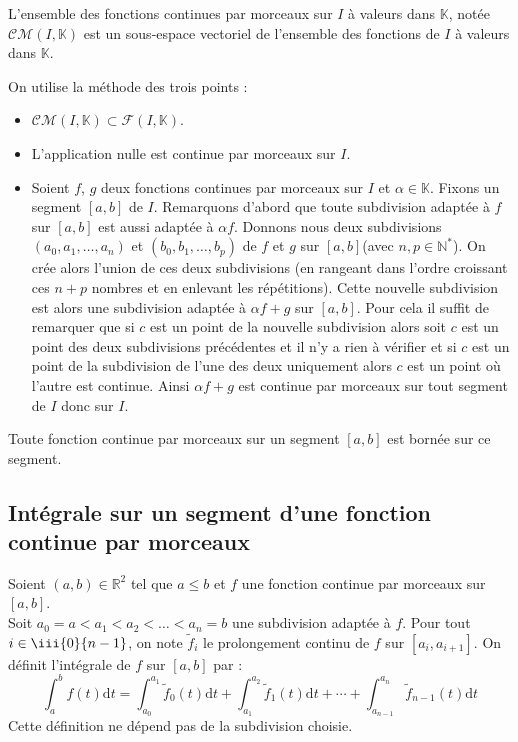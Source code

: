 \documentclass[french,11pt,twoside]{VcCours}
\newcommand{\dt}{\text{d}t}
\begin{document}
\begin{Proposition}{} L'ensemble des fonctions continues par morceaux sur $I$ à valeurs dans $\mathbb{K}$, notée $\mathcal{CM}(I,\mathbb{K})$ est un sous-espace vectoriel de l'ensemble des fonctions de $I$ à valeurs dans $\mathbb{K}$.
\end{Proposition}

\begin{Demonstration}{} On utilise la méthode des trois points :

\begin{itemize}
\item $\mathcal{CM}(I,\mathbb{K}) \subset \mathcal{F}(I, \mathbb{K})$.
\item L'application nulle est continue par morceaux sur $I$.
\item Soient $f$, $g$ deux fonctions continues par morceaux sur $I$ et $\alpha \in \mathbb{K}$. Fixons un segment $[a,b]$ de $I$. Remarquons d'abord que toute subdivision adaptée à $f$ sur $[a,b]$ est aussi adaptée à $\alpha f$. Donnons nous deux subdivisions $(a_0, a_1, \ldots, a_n)$ et $(b_0,b_1, \ldots, b_p)$ de $f$ et $g$ sur $[a,b]$(avec $n,p \in \mathbb{N}^*$). On crée alors l'union de ces deux subdivisions (en rangeant dans l'ordre croissant ces $n+p$ nombres et en enlevant les répétitions). Cette nouvelle subdivision est alors une subdivision adaptée à $\alpha f + g$ sur $[a,b]$. Pour cela il suffit de remarquer que si $c$ est un point de la nouvelle subdivision alors soit $c$ est un point des deux subdivisions précédentes et il n'y a rien à vérifier et si $c$ est un point de la subdivision de l'une des deux uniquement alors $c$ est un point où l'autre est continue. Ainsi $\alpha f+g$ est continue par morceaux sur tout segment de $I$ donc sur $I$.
\end{itemize}\vspace{-2em}
\end{Demonstration}

\begin{Proposition}{} Toute fonction continue par morceaux sur un segment $[a,b]$ est bornée sur ce segment.
\end{Proposition}



\subsection{Intégrale sur un segment d'une fonction continue par morceaux}

\begin{TheoremeDefinition}{} 
Soient $(a,b) \in \mathbb{R}^2$ tel que $a \leq b$ et $f$ une fonction continue par morceaux sur $[a,b]$.\\
Soit $a_0 = a < a_1 < a_2 < \dots < a_n =b$ une subdivision adaptée à $f$. Pour tout $i \in \iii{0}{n-1}$, on note $\tilde{f}_i$ le prolongement continu de $f$ sur $[a_i,a_{i+1}]$. On définit l'intégrale de $f$ sur $[a,b]$ par :
$$ \int_{a}^b f(t) \dt = \int_{a_0}^{a_1} \tilde{f}_0(t) \dt + \int_{a_1}^{a_2} \tilde{f}_1(t) \dt + \cdots + \int_{a_{n-1}}^{a_n} \tilde{f}_{n-1}(t) \dt$$
Cette définition ne dépend pas de la subdivision choisie.
\end{TheoremeDefinition}
\end{document}
